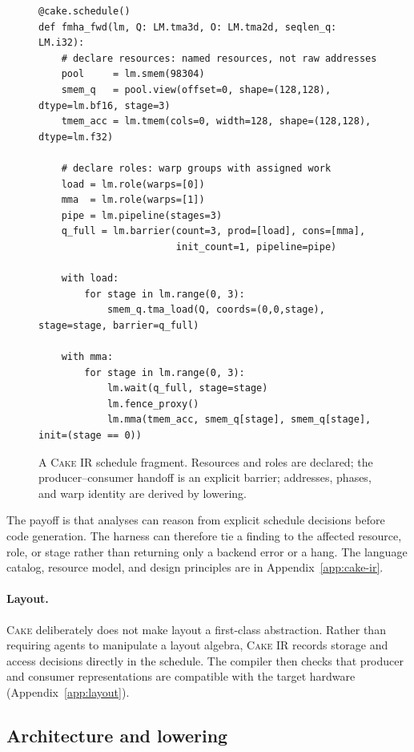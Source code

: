 \documentclass[11pt]{article}
\newcommand{\cake}{\textsc{Cake}}
\newcommand{\cakeir}{\textsc{Cake IR}}
\begin{document}
\begin{figure}[t]
\begin{lstlisting}
@cake.schedule()
def fmha_fwd(lm, Q: LM.tma3d, O: LM.tma2d, seqlen_q: LM.i32):
    # declare resources: named resources, not raw addresses
    pool     = lm.smem(98304)
    smem_q   = pool.view(offset=0, shape=(128,128), dtype=lm.bf16, stage=3)
    tmem_acc = lm.tmem(cols=0, width=128, shape=(128,128), dtype=lm.f32)

    # declare roles: warp groups with assigned work
    load = lm.role(warps=[0])
    mma  = lm.role(warps=[1])
    pipe = lm.pipeline(stages=3)
    q_full = lm.barrier(count=3, prod=[load], cons=[mma],
                        init_count=1, pipeline=pipe)

    with load:
        for stage in lm.range(0, 3):
            smem_q.tma_load(Q, coords=(0,0,stage), stage=stage, barrier=q_full)

    with mma:
        for stage in lm.range(0, 3):
            lm.wait(q_full, stage=stage)
            lm.fence_proxy()
            lm.mma(tmem_acc, smem_q[stage], smem_q[stage], init=(stage == 0))
\end{lstlisting}
\caption{A \cakeir{} schedule fragment. Resources and roles are declared; the
producer--consumer handoff is an explicit barrier; addresses, phases, and warp
identity are derived by lowering.}
\label{fig:ir-example}
\end{figure}

The payoff is that analyses can reason from explicit schedule decisions before
code generation. The harness can therefore tie a finding to the affected
resource, role, or stage rather than returning only a backend error or a hang.
The language catalog, resource model, and design principles are in
Appendix~\ref{app:cake-ir}.

\paragraph{Layout.}
\cake{} deliberately does not make layout a first-class abstraction. Rather
than requiring agents to manipulate a layout algebra, \cakeir{} records storage
and access decisions directly in the schedule. The compiler then checks that
producer and consumer representations are compatible with the target hardware
(Appendix~\ref{app:layout}).

\subsection{Architecture and lowering}
\label{sec:arch}
\end{document}
